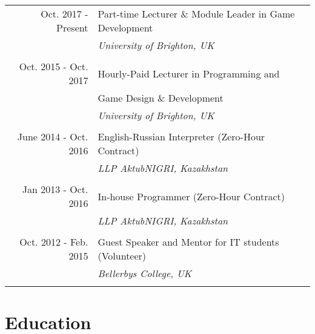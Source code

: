 \documentclass[a4paper,11pt]{article} %
\begin{document}
\begin{tabular}{r|p{11cm}}

Oct. 2017 - Present & Part-time Lecturer \& Module Leader in Game Development\\
& \emph{University of Brighton, UK}\\
\multicolumn{2}{c}{} \\


Oct. 2015 - Oct. 2017 & Hourly-Paid Lecturer in Programming and\\
& Game Design \& Development\\
& \emph{University of Brighton, UK}\\
\multicolumn{2}{c}{} \\


June 2014 - Oct. 2016 & English-Russian Interpreter (Zero-Hour Contract)\\
& \emph{LLP AktubNIGRI, Kazakhstan}\\
\multicolumn{2}{c}{} \\


Jan 2013 - Oct. 2016 & In-house Programmer (Zero-Hour Contract)\\
& \emph{LLP AktubNIGRI, Kazakhstan}\\
\multicolumn{2}{c}{} \\


Oct. 2012 - Feb. 2015 & Guest Speaker and Mentor for IT students (Volunteer)\\
& \emph{Bellerbys College, UK}\\
\multicolumn{2}{c}{} \\

\end{tabular}


\section{Education}
\end{document}
